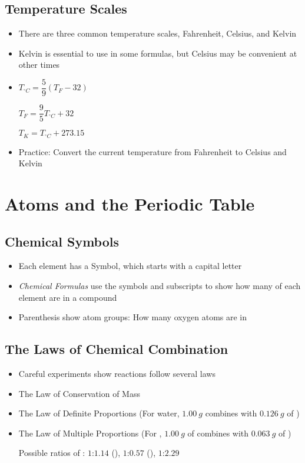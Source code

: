 \documentclass[12pt, openany, letterpaper]{memoir}
\begin{document}
\section{Temperature Scales}
\begin{itemize}
	\item There are three common temperature scales, Fahrenheit, Celsius, and Kelvin
	\item Kelvin is essential to use in some formulas, but Celsius may be convenient at other times
	\item $T_{^\circ C}=\dfrac{5}{9}\left(T_F-32\right)$

	      $T_F=\dfrac{9}{5}T_{^\circ C}+32$

	      $T_K=T_{^\circ C}+273.15$

	\item Practice: Convert the current temperature from Fahrenheit to Celsius and Kelvin
\end{itemize}

\chapter{Atoms and the Periodic Table}
\section{Chemical Symbols}
\begin{itemize}
	\item Each element has a Symbol, which starts with a capital letter
	\item \emph{Chemical Formulas} use the symbols and subscripts to show how many of each element are in a compound
	\item Parenthesis show atom groups: How many oxygen atoms are in 
\end{itemize}
\section{The Laws of Chemical Combination}
\begin{itemize}
	\item Careful experiments show reactions follow several laws
	\item The Law of Conservation of Mass
	\item The Law of Definite Proportions (For water, $1.00~g$  combines with $0.126~g$ of )
	\item The Law of Multiple Proportions (For , $1.00~g$ of  combines with $0.063~g$ of )

	      Possible ratios of : $1$:$1.14$ (), $1$:$0.57$ (), $1$:$2.29$ 
\end{itemize}
\end{document}
